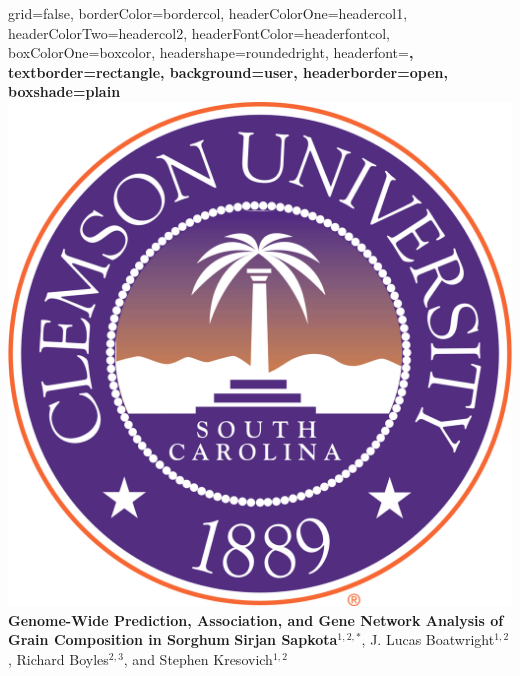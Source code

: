 \documentclass[a0paper,portrait]{baposter}
\begin{document}

\begin{poster}{
grid=false,
borderColor=bordercol, %
headerColorOne=headercol1, %
headerColorTwo=headercol2, %
headerFontColor=headerfontcol, %
boxColorOne=boxcolor, %
headershape=roundedright, %
headerfont=\Large\sf\bf, %
textborder=rectangle,
background=user,
headerborder=open, %
boxshade=plain
}
{\includegraphics[scale=0.07]{Clemson_logo.png}}
%
%
{\bf  \huge {Genome-Wide Prediction, Association, and Gene Network Analysis of Grain Composition in Sorghum} }
{\large \textbf{Sirjan Sapkota}$^{1,2,*}$, J. Lucas Boatwright$^{1,2}$, Richard Boyles$^{2,3}$, and Stephen Kresovich$^{1,2}$\\  %
 
}
\end{poster}
\end{document}
